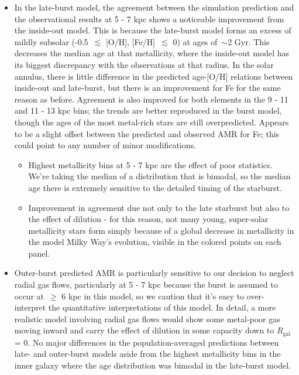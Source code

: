 \documentclass[a4paper, fleqn, usenatbib, useAMS]{mnras}
\begin{document}
\begin{itemize}
	\item In the late-burst model, the agreement between the simulation 
	prediction and the observational results at 5 - 7 kpc shows a noticeable 
	improvement from the inside-out model. This is because the late-burst 
	model forms an excess of mildly subsolar (-0.5~$\lesssim$ [O/H], 
	[Fe/H]~$\lesssim$ 0) at ages of~$\sim$2 Gyr. This decreases the median 
	age at that metallicity, where the inside-out model has its biggest 
	discrepancy with the observations at that radius. In the solar annulus, 
	there is little difference in the predicted age-[O/H] relations 
	between inside-out and late-burst, but there is an improvement for Fe for 
	the same reason as before. Agreement is also improved for both elements 
	in the 9 - 11 and 11 - 13 kpc bins; the trends are better reproduced in 
	the burst model, though the ages of the most metal-rich stars are still 
	overpredicted. Appears to be a slight offset between the predicted and 
	observed AMR for Fe; this could point to any number of minor modifications. 
	\begin{itemize} 
		\item Highest metallicity bins at 5 - 7 kpc are the effect of poor 
		statistics. We're taking the median of a distribution that is 
		bimodal, so the median age there is extremely sensitive to the 
		detailed timing of the starburst. 

		\item Improvement in agreement due not only to the late starburst but 
		also to the effect of dilution - for this reason, not many young, 
		super-solar metallicity stars form simply because of a global decrease 
		in metallicity in the model Milky Way's evolution, visible in the 
		colored points on each panel. 
	\end{itemize} 

	\item Outer-burst predicted AMR is particularly sensitive to our decision 
	to neglect radial gas flows, particularly at 5 - 7 kpc because the burst 
	is assumed to occur at~$\geq$ 6 kpc in this model, so we caution that it's 
	easy to over-interpret the quantitative interpretations of this model. In 
	detail, a more realistic model involving radial gas flows would show some 
	metal-poor gas moving inward and carry the effect of dilution in some 
	capacity down to $R_\text{gal}$ = 0. No major differences in the 
	population-averaged predictions between late- and outer-burst models aside 
	from the highest metallicity bins in the inner galaxy where the age 
	distribution was bimodal in the late-burst model. 


\end{itemize}
\end{document}
